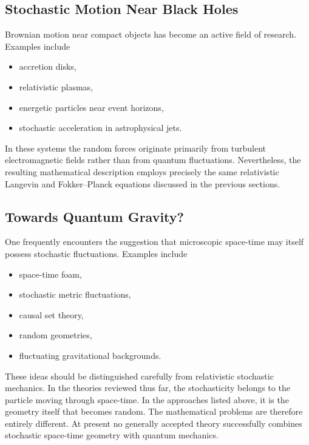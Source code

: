 \subsection{Stochastic Motion Near Black Holes}
Brownian motion near compact objects has become an active field of
research.
Examples include
\begin{itemize}
\item accretion disks,
\item relativistic plasmas,
\item energetic particles near event horizons,
\item stochastic acceleration in astrophysical jets.
\end{itemize}
In these systems the random forces originate primarily from turbulent
electromagnetic fields rather than from quantum fluctuations.
Nevertheless, the resulting mathematical description employs precisely
the same relativistic Langevin and Fokker--Planck equations discussed in
the previous sections.
\subsection{Towards Quantum Gravity?}
One frequently encounters the suggestion that microscopic space-time may
itself possess stochastic fluctuations.
Examples include
\begin{itemize}
\item space-time foam,
\item stochastic metric fluctuations,
\item causal set theory,
\item random geometries,
\item fluctuating gravitational backgrounds.
\end{itemize}
These ideas should be distinguished carefully from relativistic
stochastic mechanics.
In the theories reviewed thus far, the stochasticity belongs to the
particle moving through space-time.
In the approaches listed above, it is the geometry itself that becomes
random.
The mathematical problems are therefore entirely different.
At present no generally accepted theory successfully combines stochastic
space-time geometry with quantum mechanics.
